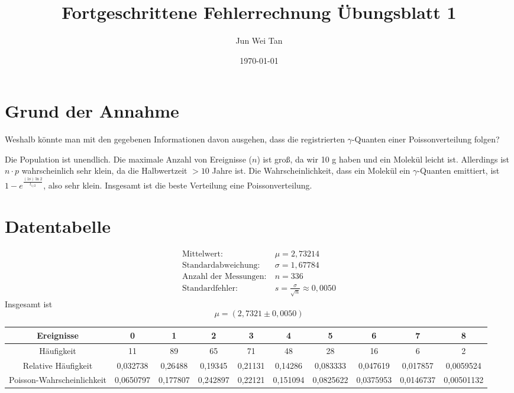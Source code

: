 \documentclass[prb,12pt]{revtex4-2}
\theoremstyle{definition}
\theoremstyle{definition}
\begin{document}
\title{Fortgeschrittene Fehlerrechnung Übungsblatt 1}
	\author{Jun Wei Tan}
	\date{\today}
	\maketitle

\section{Grund der Annahme}
\begin{tcolorbox}
	Weshalb könnte man mit den gegebenen Informationen davon ausgehen, dass die registrierten $\gamma$-Quanten einer Poissonverteilung folgen?
\end{tcolorbox}
Die Population ist unendlich. Die maximale Anzahl von Ereignisse ($n$) ist groß, da wir 10 g haben und ein Molekül leicht ist. Allerdings ist $n\cdot p$ wahrscheinlich sehr klein, da die Halbwertzeit $>10$ Jahre ist. Die Wahrscheinlichkeit, dass ein Molekül ein $\gamma$-Quanten emittiert, ist $1-e^{\frac{(1\text{s})\ln 2}{t_{1/2}}}$, also sehr klein. Insgesamt ist die beste Verteilung eine Poissonverteilung.
\section{Datentabelle}
\begin{align*}
	\text{Mittelwert}:&~\mu=2,73214\\
	\text{Standardabweichung}:&~\sigma=1,67784\\
	\text{Anzahl der Messungen}:&~n=336\\
	\text{Standardfehler}:&~s=\frac{\sigma}{\sqrt{n}}\approx 0,0050
\end{align*}
Insgesamt ist
\[\mu=(2,7321\pm 0,0050)\]
\begin{table}[h]
	{\scriptsize
\begin{tabular}{cccccccccc}
	\toprule
	\textbf{Ereignisse} & 0 & 1 & 2 & 3 & 4 & 5 & 6 & 7 & 8 \\\midrule
	H\"{a}ufigkeit & 11 & 89 & 65 & 71 & 48 & 28 & 16 & 6 & 2 \\\midrule
	Relative H\"{a}ufigkeit & 0,032738 & 0,26488 & 0,19345 & 0,21131 & 0,14286 & 0,083333 & 0,047619 & 0,017857 & 0,0059524 \\\midrule
	Poisson-Wahrscheinlichkeit & 0,0650797 & 0,177807 & 0,242897 & 0,22121 & 0,151094 & 0,0825622 & 0,0375953 & 0,0146737 & 0,00501132 \\\bottomrule
\end{tabular}
}
\end{table}
\end{document}
